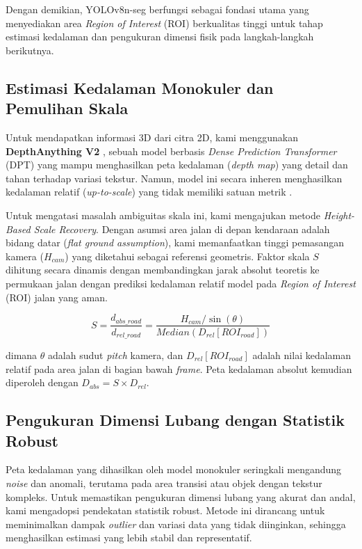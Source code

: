 Dengan demikian, YOLOv8n-seg berfungsi sebagai fondasi utama yang menyediakan area \textit{Region of Interest} (ROI) berkualitas tinggi untuk tahap estimasi kedalaman dan pengukuran dimensi fisik pada langkah-langkah berikutnya.

\subsection{Estimasi Kedalaman Monokuler dan Pemulihan Skala}
Untuk mendapatkan informasi 3D dari citra 2D, kami menggunakan \textbf{DepthAnything V2} \cite{depthanything2024}, sebuah model berbasis \textit{Dense Prediction Transformer} (DPT) yang mampu menghasilkan peta kedalaman (\textit{depth map}) yang detail dan tahan terhadap variasi tekstur. Namun, model ini secara inheren menghasilkan kedalaman relatif (\textit{up-to-scale}) yang tidak memiliki satuan metrik \cite{florea2025}.

Untuk mengatasi masalah ambiguitas skala ini, kami mengajukan metode \textit{Height-Based Scale Recovery}. Dengan asumsi area jalan di depan kendaraan adalah bidang datar (\textit{flat ground assumption}), kami memanfaatkan tinggi pemasangan kamera ($H_{cam}$) yang diketahui sebagai referensi geometris. Faktor skala $S$ dihitung secara dinamis dengan membandingkan jarak absolut teoretis ke permukaan jalan dengan prediksi kedalaman relatif model pada \textit{Region of Interest} (ROI) jalan yang aman.

\begin{equation}
S = \frac{d_{abs\_road}}{d_{rel\_road}} = \frac{H_{cam} / \sin(\theta)}{Median(D_{rel}[ROI_{road}])}
\end{equation}

dimana $\theta$ adalah sudut \textit{pitch} kamera, dan $D_{rel}[ROI_{road}]$ adalah nilai kedalaman relatif pada area jalan di bagian bawah \textit{frame}. Peta kedalaman absolut kemudian diperoleh dengan $D_{abs} = S \times D_{rel}$.

\subsection{Pengukuran Dimensi Lubang dengan Statistik Robust}
Peta kedalaman yang dihasilkan oleh model monokuler seringkali mengandung \textit{noise} dan anomali, terutama pada area transisi atau objek dengan tekstur kompleks. Untuk memastikan pengukuran dimensi lubang yang akurat dan andal, kami mengadopsi pendekatan statistik robust. Metode ini dirancang untuk meminimalkan dampak \textit{outlier} dan variasi data yang tidak diinginkan, sehingga menghasilkan estimasi yang lebih stabil dan representatif.

